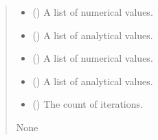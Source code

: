 \documentclass[a4paper,11pt,english,openany]{sphinxmanual}
\begin{document}
\begin{fulllineitems}
\begin{fulllineitems}
\label{\detokenize{api/spyice.utils.error_norms:src.spyice.utils.error_norms.ErrorNorms.__init__}}
\pysigstartsignatures
\pysiglinewithargsret
{}
{\sphinxparamcomma {}}
{}
\pysigstopsignatures\begin{quote}\begin{description}
\begin{itemize}
\item {} 
\sphinxAtStartPar
{} () \textendash{} A list of numerical values.

\item {} 
\sphinxAtStartPar
{} () \textendash{} A list of analytical values.

\end{itemize}

\begin{itemize}
\item {} 
\sphinxAtStartPar
{} () \textendash{} A list of numerical values.

\item {} 
\sphinxAtStartPar
{} () \textendash{} A list of analytical values.

\item {} 
\sphinxAtStartPar
{} () \textendash{} The count of iterations.

\end{itemize}

\sphinxAtStartPar
None

\end{description}\end{quote}

\end{fulllineitems}



\end{fulllineitems}
\end{document}
